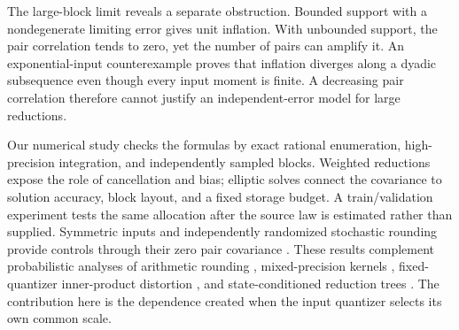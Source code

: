 The large-block limit reveals a separate obstruction. Bounded support with
a nondegenerate limiting error gives unit inflation. With unbounded support,
the pair correlation tends to zero, yet the number of pairs can amplify it.
An exponential-input counterexample proves that inflation diverges along a
dyadic subsequence even though every input moment is finite. A decreasing
pair correlation therefore cannot justify an independent-error model for
large reductions.

Our numerical study checks the formulas by exact rational enumeration,
high-precision integration, and independently sampled blocks. Weighted
reductions expose the role of cancellation and bias; elliptic solves connect
the covariance to solution accuracy, block layout, and a fixed storage
budget. A train/validation experiment tests the same allocation after the
source law is estimated rather than supplied. Symmetric inputs and independently randomized stochastic rounding
provide controls through their zero pair covariance
\cite{connolly2021,croci2022}. These results complement probabilistic
analyses of arithmetic rounding \cite{higham2019,higham2020,hallman2023},
mixed-precision kernels \cite{fasi2023}, fixed-quantizer inner-product
distortion \cite{ang2026quant}, and state-conditioned reduction trees
\cite{sao2026trees}. The contribution here is the dependence created when
the input quantizer selects its own common scale.
